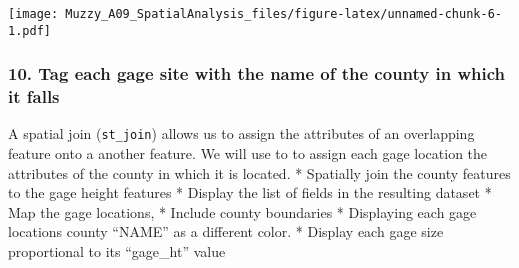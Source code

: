 \documentclass[]{article}
\newenvironment{Shaded}{\begin{snugshade}}{\end{snugshade}}
\newcommand{\KeywordTok}[1]{\textcolor[rgb]{0.13,0.29,0.53}{\textbf{#1}}}
\newcommand{\DataTypeTok}[1]{\textcolor[rgb]{0.13,0.29,0.53}{#1}}
\newcommand{\DecValTok}[1]{\textcolor[rgb]{0.00,0.00,0.81}{#1}}
\newcommand{\FloatTok}[1]{\textcolor[rgb]{0.00,0.00,0.81}{#1}}
\newcommand{\StringTok}[1]{\textcolor[rgb]{0.31,0.60,0.02}{#1}}
\newcommand{\CommentTok}[1]{\textcolor[rgb]{0.56,0.35,0.01}{\textit{#1}}}
\newcommand{\OtherTok}[1]{\textcolor[rgb]{0.56,0.35,0.01}{#1}}
\newcommand{\OperatorTok}[1]{\textcolor[rgb]{0.81,0.36,0.00}{\textbf{#1}}}
\newcommand{\NormalTok}[1]{#1}
\begin{document}
\begin{Shaded}
\end{Shaded}

\texttt{[image: Muzzy\_A09\_SpatialAnalysis\_files/figure-latex/unnamed-chunk-6-1.pdf]}

\subsubsection{10. Tag each gage site with the name of the county in
which it
falls}\label{tag-each-gage-site-with-the-name-of-the-county-in-which-it-falls}

A spatial join (\texttt{st\_join}) allows us to assign the attributes of
an overlapping feature onto a another feature. We will use to to assign
each gage location the attributes of the county in which it is located.
* Spatially join the county features to the gage height features *
Display the list of fields in the resulting dataset * Map the gage
locations, * Include county boundaries * Displaying each gage locations
county ``NAME'' as a different color. * Display each gage size
proportional to its ``gage\_ht'' value
\end{document}
